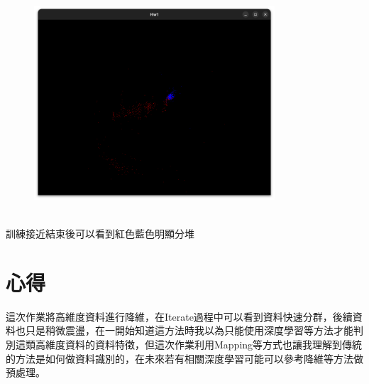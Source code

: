 \documentclass[a4paper,12pt]{article}
\begin{document}
\begin{figure}[H]
    \centering
    \includegraphics[width=0.8\textwidth]{img/img3.png}
\end{figure}\\
訓練接近結束後可以看到紅色藍色明顯分堆



\section{心得}
    這次作業將高維度資料進行降維，在Iterate過程中可以看到資料快速分群，後續資料也只是稍微震盪，在一開始知道這方法時我以為只能使用深度學習等方法才能判別這類高維度資料的資料特徵，但這次作業利用Mapping等方式也讓我理解到傳統的方法是如何做資料識別的，在未來若有相關深度學習可能可以參考降維等方法做預處理。
\end{document}
